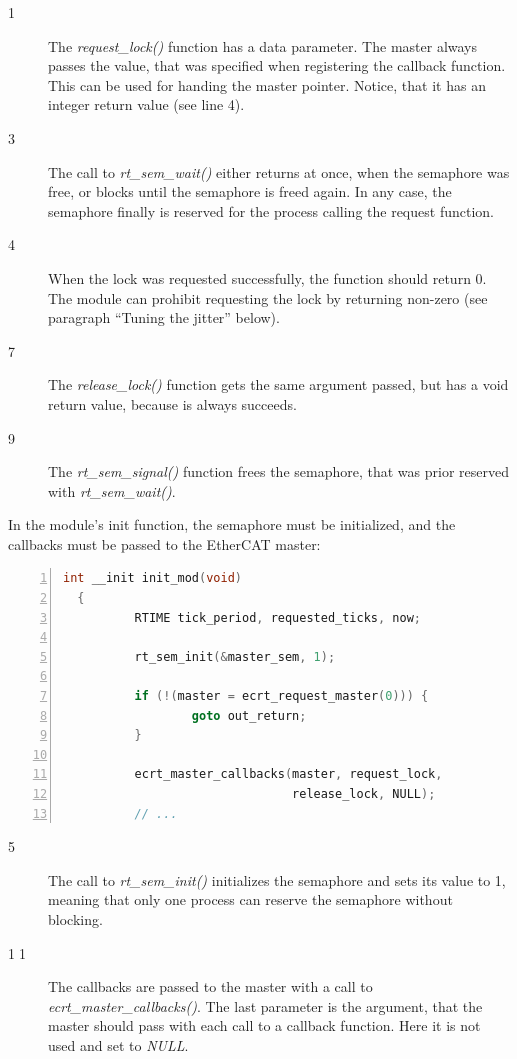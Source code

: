 \documentclass[a4paper,12pt,BCOR6mm,bibtotoc,idxtotoc]{scrbook}
\newcommand{\linenum}[1]{\normalfont\textcircled{\tiny #1}}
\begin{document}
\begin{description}
\item[\linenum{1}] The \textit{request\_lock()}
  function has a data parameter. The master always passes the value,
  that was specified when registering the callback function. This can
  be used for handing the master pointer. Notice, that it has an
  integer return value (see line 4).
\item[\linenum{3}] The call to
  \textit{rt\_sem\_wait()} either returns at once, when the semaphore
  was free, or blocks until the semaphore is freed again. In any case,
  the semaphore finally is reserved for the process calling the
  request function.
\item[\linenum{4}] When the lock was requested
  successfully, the function should return 0. The module can prohibit
  requesting the lock by returning non-zero (see paragraph ``Tuning
  the jitter'' below).
\item[\linenum{7}] The \textit{release\_lock()}
  function gets the same argument passed, but has a void return value,
  because is always succeeds.
\item[\linenum{9}] The \textit{rt\_sem\_signal()}
  function frees the semaphore, that was prior reserved with
  \textit{rt\_sem\_wait()}.
\end{description}

In the module's init function, the semaphore must be initialized, and
the callbacks must be passed to the EtherCAT master:

\begin{lstlisting}[gobble=2,language=C,numbers=left,caption={Module init
    function for concurrent access},label={lst:coninit}]
  int __init init_mod(void)
  {
          RTIME tick_period, requested_ticks, now;

          rt_sem_init(&master_sem, 1);

          if (!(master = ecrt_request_master(0))) {
                  goto out_return;
          }

          ecrt_master_callbacks(master, request_lock,
                                release_lock, NULL);
          // ...
\end{lstlisting}

\begin{description}
\item[\linenum{5}] The call to
  \textit{rt\_sem\_init()} initializes the semaphore and sets its
  value to 1, meaning that only one process can reserve the semaphore
  without blocking.
\item[\linenum{11}] The callbacks are passed to
  the master with a call to \textit{ecrt\_master\_callbacks()}. The
  last parameter is the argument, that the master should pass with
  each call to a callback function. Here it is not used and set to
  \textit{NULL}.
\end{description}
\end{document}
